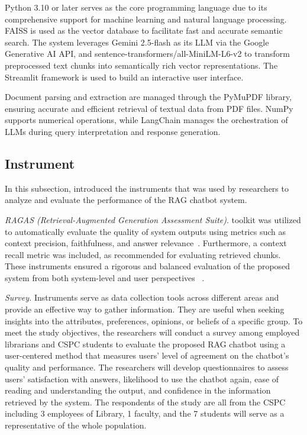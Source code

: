 \begin{refsection}
Python 3.10 or later serves as the core programming language due to its comprehensive support for machine learning and natural language processing. FAISS is used as the vector database to facilitate fast and accurate semantic search. The system leverages Gemini 2.5-flash as its LLM via the Google Generative AI API, and sentence-transformers/all-MiniLM-L6-v2 to transform preprocessed text chunks into semantically rich vector representations. The Streamlit framework is used to build an interactive user interface.

Document parsing and extraction are managed through the PyMuPDF library, ensuring accurate and efficient retrieval of textual data from PDF files. NumPy supports numerical operations, while LangChain manages the orchestration of LLMs during query interpretation and response generation.


\subsection{Instrument}

In this subsection, introduced the instruments that was used by researchers to analyze and evaluate the performance of the RAG chatbot system.

\textit{RAGAS (Retrieval-Augmented Generation Assessment Suite)}. toolkit was utilized to automatically evaluate the quality of system outputs using metrics such as context precision, faithfulness, and answer relevance~\cite{shinn2023ragas}. Furthermore, a context recall metric was included, as recommended for evaluating retrieved chunks. These instruments ensured a rigorous and balanced evaluation of the proposed system from both system-level and user perspectives~ \cite{lin2021bert}.

\textit{Survey.} Instruments serve as data collection tools across different areas and provide an effective way to gather information. They are useful when seeking insights into the attributes, preferences, opinions, or beliefs of a specific group. To meet the study objectives, the researchers will conduct a survey among employed librarians and CSPC students to evaluate the proposed RAG chatbot using a user-centered method that measures users’ level of agreement on the chatbot’s quality and performance. The researchers will develop questionnaires to assess users’ satisfaction with answers, likelihood to use the chatbot again, ease of reading and understanding the output, and confidence in the information retrieved by the system. The respondents of the study are all from the CSPC including 3 employees of Library, 1 faculty, and the 7 students will serve as a representative of the whole population.



\end{refsection}

